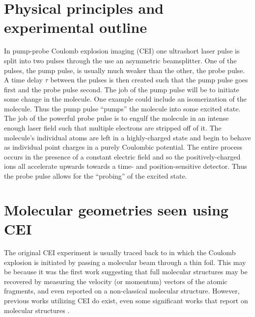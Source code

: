 \section{Physical principles and experimental outline}\label{sec:CEIphysics}

In pump-probe Coulomb explosion imaging (CEI) one ultrashort laser pulse is split into two pulses through the use an asymmetric beamsplitter. One of the pulses, the pump pulse, is usually much weaker than the other, the probe pulse. A time delay $\tau$ between the pulses is then created such that the pump pulse goes first and the probe pulse second. The job of the pump pulse will be to initiate some change in the molecule. One example could include an isomerization of the molecule. Thus the pump pulse ``pumps'' the molecule into some excited state. The job of the powerful probe pulse is to engulf the molecule in an intense enough laser field such that multiple electrons are stripped off of it. The molecule's individual atoms are left in a highly-charged state and begin to behave as individual point charges in a purely Coulombic potential. The entire process occurs in the presence of a constant electric field and so the positively-charged ions all accelerate upwards towards a time- and position-sensitive detector. Thus the probe pulse allows for the ``probing'' of the excited state.


\section{Molecular geometries seen using CEI}
The original CEI experiment is usually traced back to \citet{Vager89} in which the Coulomb explosion is initiated by passing a molecular beam through a thin foil. This may be because it was the first work suggesting that full molecular structures may be recovered by measuring the velocity (or momentum) vectors of the atomic fragments, and even reported on a non-classical molecular structure. However, previous works utilizing CEI do exist, even some significant works that report on molecular structures \citep{Kanter79}.

